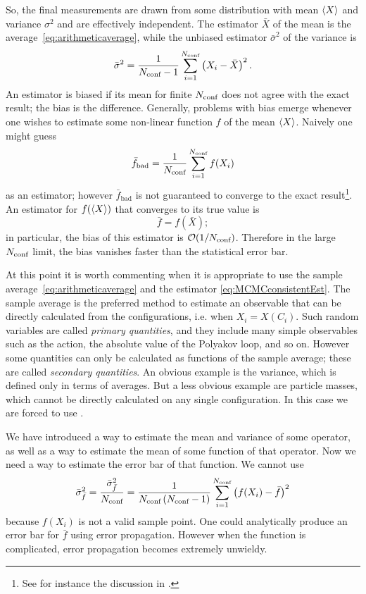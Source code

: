 So, the final measurements are drawn from some
distribution with mean $\ev{X}$ and variance $\sigma^2$
and are effectively independent. The
estimator $\bar{X}$ of the mean is the average~\eqref{eq:arithmeticaverage}, 
while the unbiased estimator $\bar{\sigma}^2$ of the variance is
\begin{equation}\label{eq:estimatorvariance}
  \bar{\sigma}^2=\frac{1}{N_{\text{conf}}-1}\sum_{i=1}^{N_{\text{conf}}}
      \left(X_i-\bar{X}\right)^2.
\end{equation}
An estimator is biased if its mean for finite $N_{\text{conf}}$ 
does not agree with the exact result;
the bias is the difference. Generally, problems with bias emerge whenever
one wishes to estimate some non-linear function $f$ of the mean $\ev{X}$.
Naively one might guess
\begin{equation}
  \bar{f}_\text{bad}=\frac{1}{N_{\text{conf}}}\sum_{i=1}^{N_{\text{conf}}}f(X_i)
\end{equation}
as an estimator; however $\bar{f}_\text{bad}$ is not guaranteed
to converge to the exact result\footnote{See for instance the discussion
in .}. 
An estimator for $f(\ev{X})$ that converges to its true value is
\begin{equation}\label{eq:MCMCconsistentEst}
  \bar{f}=f(\bar{X});
\end{equation}
in particular, the bias of this estimator is $\order{1/\nconf}$.
Therefore in the large $N_{\text{conf}}$ limit, the bias vanishes faster than the 
statistical error bar.

At this point it is worth commenting when it is appropriate to use
the sample average~\eqref{eq:arithmeticaverage} and the estimator
\eqref{eq:MCMCconsistentEst}. The sample average is the preferred 
method to estimate an observable that can be directly calculated from 
the configurations, i.e. when $X_i=X(C_i)$. 
Such random variables are called {\it primary quantities},
 and they include many simple observables such
as the action, the absolute value of the Polyakov loop, and so on. 
However some quantities can only be calculated 
as functions of the sample average; these are called {\it secondary quantities}.
 An obvious example is the variance, which is defined
only in terms of averages. But a less obvious example are particle masses,
which cannot be directly calculated on any single configuration. In this
case we are forced to use .

We have introduced a way to estimate the mean and variance of some
operator, as well as a way to estimate the mean of some function of
that operator. Now we need a way to estimate the error bar of that
function. We cannot use
\begin{equation}
  \bar{\sigma}^2_{\bar{f}}=\frac{\bar{\sigma}^2_{\bar{f}}}{N_{\text{conf}}}
    =\frac{1}{N_{\text{conf}}\,(N_{\text{conf}}-1)}\sum_{i=1}^{N_{\text{conf}}}
     \left(f(X_i)-\bar{f}\right)^2
\end{equation}
because $f(X_i)$ is not a valid sample point.
One could analytically produce an error bar for $\bar{f}$ 
using error propagation. However when the function is complicated, 
error propagation becomes extremely unwieldy.

